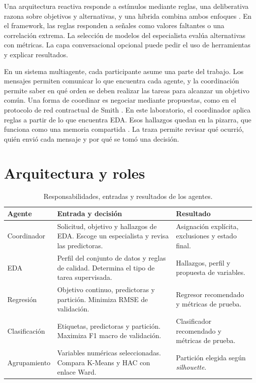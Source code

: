 \documentclass[11pt]{article}
\begin{document}
Una arquitectura reactiva responde a estímulos mediante reglas, una deliberativa razona sobre objetivos y alternativas, y una híbrida combina ambos enfoques \cite{wooldridge}. En el framework, las reglas responden a señales como valores faltantes o una correlación extrema. La selección de modelos del especialista evalúa alternativas con métricas. La capa conversacional opcional puede pedir el uso de herramientas y explicar resultados.

En un sistema multiagente, cada participante asume una parte del trabajo. Los mensajes permiten comunicar lo que encuentra cada agente, y la coordinación permite saber en qué orden se deben realizar las tareas para alcanzar un objetivo común. Una forma de coordinar es negociar mediante propuestas, como en el protocolo de red contractual de Smith \cite{smith}. En este laboratorio, el coordinador aplica reglas a partir de lo que encuentra EDA. Esos hallazgos quedan en la pizarra, que funciona como una memoria compartida \cite{corkill}. La traza permite revisar qué ocurrió, quién envió cada mensaje y por qué se tomó una decisión.

\section{Arquitectura y roles}

\begin{table}[htbp]
\centering
\caption{Responsabilidades, entradas y resultados de los agentes.}
\begin{tabularx}{\textwidth}{@{}l>{\raggedright\arraybackslash}X>{\raggedright\arraybackslash}X@{}}
\toprule
Agente & Entrada y decisión & Resultado \\
\midrule
Coordinador & Solicitud, objetivo y hallazgos de EDA. Escoge un especialista y revisa las predictoras. & Asignación explícita, exclusiones y estado final. \\
EDA & Perfil del conjunto de datos y reglas de calidad. Determina el tipo de tarea supervisada. & Hallazgos, perfil y propuesta de variables. \\
Regresión & Objetivo continuo, predictoras y partición. Minimiza RMSE de validación. & Regresor recomendado y métricas de prueba. \\
Clasificación & Etiquetas, predictoras y partición. Maximiza F1 macro de validación. & Clasificador recomendado y métricas de prueba. \\
Agrupamiento & Variables numéricas seleccionadas. Compara K-Means y HAC con enlace Ward. & Partición elegida según \textit{silhouette}. \\
\bottomrule
\end{tabularx}
\end{table}
\end{document}
